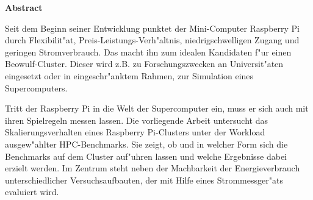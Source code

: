 \vspace*{2cm}

\begin{center}
    \textbf{Abstract}
\end{center}

\vspace*{1cm}

\noindent
Seit dem Beginn seiner Entwicklung punktet der Mini-Computer Raspberry Pi durch Flexibilit"at, Preis-Leistungs-Verh"altnis, niedrigschwelligen Zugang und geringen Stromverbrauch. Das macht ihn zum idealen Kandidaten f"ur einen Beowulf-Cluster. Dieser wird z.B. zu Forschungszwecken an Universit"aten eingesetzt oder in eingeschr"anktem Rahmen, zur Simulation eines Supercomputers. 

Tritt der Raspberry Pi in die Welt der Supercomputer ein, muss er sich auch mit ihren Spielregeln messen lassen. Die vorliegende Arbeit untersucht das Skalierungsverhalten eines Raspberry Pi-Clusters unter der Workload ausgew"ahlter HPC-Benchmarks. Sie zeigt, ob und in welcher Form sich die Benchmarks auf dem Cluster auf"uhren lassen und welche Ergebnisse dabei erzielt werden. Im Zentrum steht neben der Machbarkeit der Energieverbrauch unterschiedlicher Versuchsaufbauten, der mit Hilfe eines Strommessger"ats evaluiert wird. 


